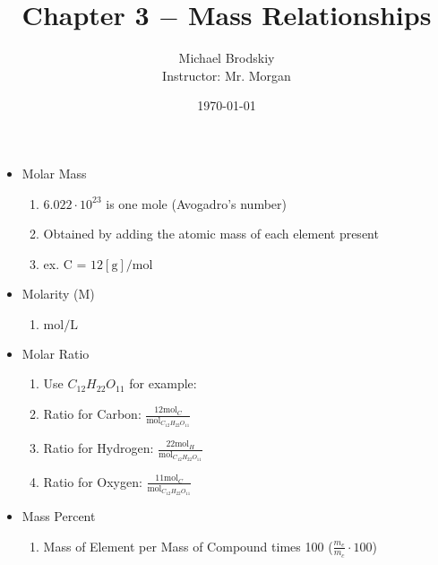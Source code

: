 \documentclass[12pt]{article}
\title{Chapter 3 $-$ Mass Relationships}
\date{\today}
\author{Michael Brodskiy\\ \small Instructor: Mr. Morgan}
\begin{document}
\maketitle

\begin{itemize}

  \item Molar Mass

    \begin{enumerate}

      \item $6.022\cdot10^23$ is one mole (Avogadro's number)

      \item Obtained by adding the atomic mass of each element present

      \item ex. C = $12[\si{\gram}]/\si{\mole}$

    \end{enumerate}

  \item Molarity (M)

    \begin{enumerate}

      \item $\si{\mole}/\si{\liter}$

    \end{enumerate}

  \item Molar Ratio

    \begin{enumerate}

      \item Use $C_12H_22O_11$ for example:

      \item Ratio for Carbon: $\frac{12\si{\mole}_C}{\si{\mole}_{C_{12}H_{22}O_{11}}}$

      \item Ratio for Hydrogen: $\frac{22\si{\mole}_H}{\si{\mole}_{C_{12}H_{22}O_{11}}}$

      \item Ratio for Oxygen: $\frac{11\si{\mole}_C}{\si{\mole}_{C_{12}H_{22}O_{11}}}$

    \end{enumerate}

  \item Mass Percent

    \begin{enumerate}

      \item Mass of Element per Mass of Compound times 100 ($\frac{m_e}{m_c}\cdot100$)

    \end{enumerate}

\end{itemize}
\end{document}
